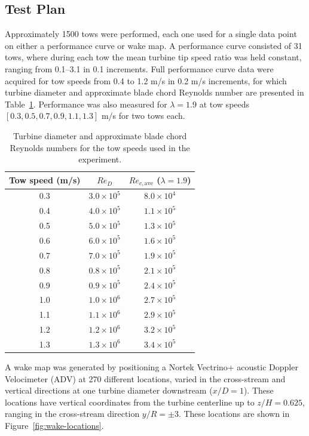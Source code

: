 \documentclass[energies,article,accept,moreauthors,pdftex,12pt,a4paper]{mdpi}
\begin{document}
\subsection{Test Plan} 

Approximately 1500 tows were performed, each one used for a single data point on
either a performance curve or wake map. A performance curve consisted of 31
tows, where during each tow the mean turbine tip speed ratio was held constant,
ranging from 0.1--3.1 in 0.1 increments. Full performance curve data were
acquired for tow speeds from 0.4 to 1.2 m/s in 0.2 m/s increments, for which
turbine diameter and approximate blade chord Reynolds number are presented in
Table~\ref{tab:Re}. Performance was also measured for $\lambda=1.9$ at tow
speeds $[0.3, 0.5, 0.7, 0.9, 1.1, 1.3]$ m/s for two tows each.

\begin{table}
\centering
\begin{tabular}{ccc}
Tow speed (m/s) & $Re_D$ & $Re_{c,\mathrm{ave}}$ ($\lambda = 1.9$) \\ 
\hline
0.3 & $3.0 \times 10^5$ & $8.0 \times 10^4$ \\ 
0.4 & $4.0 \times 10^5$ & $1.1 \times 10^5$ \\ 
0.5 & $5.0 \times 10^5$ & $1.3 \times 10^5$ \\ 
0.6 & $6.0 \times 10^5$ & $1.6 \times 10^5$ \\ 
0.7 & $7.0 \times 10^5$ & $1.9 \times 10^5$ \\ 
0.8 & $0.8 \times 10^5$ & $2.1 \times 10^5$ \\ 
0.9 & $0.9 \times 10^5$ & $2.4 \times 10^5$ \\ 
1.0 & $1.0 \times 10^6$ & $2.7 \times 10^5$ \\ 
1.1 & $1.1 \times 10^6$ & $2.9 \times 10^5$ \\ 
1.2 & $1.2 \times 10^6$ & $3.2 \times 10^5$ \\ 
1.3 & $1.3 \times 10^6$ & $3.4 \times 10^5$ \\ 
\end{tabular} 
\caption{Turbine diameter and approximate blade chord Reynolds numbers for the
tow speeds used in the experiment.}
\label{tab:Re}
\end{table}

A wake map was generated by positioning a Nortek Vectrino+ acoustic Doppler
Velocimeter (ADV) at 270 different locations, varied in the cross-stream and
vertical directions at one turbine diameter downstream ($x/D=1$). These
locations have vertical coordinates from the turbine centerline up to
$z/H=0.625$, ranging in the cross-stream direction $y/R = \pm 3$. These
locations are shown in Figure~\ref{fig:wake-locations}.
\end{document}
